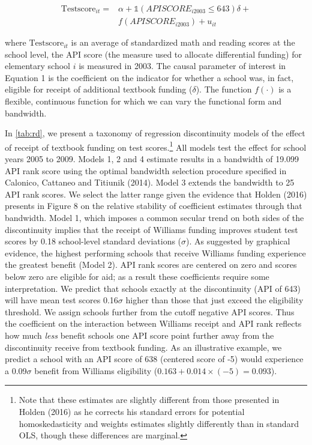 \documentclass[a4paper, 11pt]{article}
\begin{document}
\begin{enumerate}
\begin{equation} 
\begin{aligned}
\text{Testscore}_{it}= & \alpha+ \mathbb{1} \left(APISCORE_{i2003} \leq 643\right)\delta + \\
& f\left(APISCORE_{i2003}\right)+u_{it}
\label{eq:1}
\end{aligned}
\end{equation}

	where $\text{Testscore}_{it}$ is an average of standardized math and reading scores at the school level, the API score (the measure used to allocate differential funding) for elementary school $i$ is measured in 2003. The causal parameter of interest in Equation 1 is the coefficient on the indicator for whether a school was, in fact, eligible for receipt of additional textbook funding ($\delta$). The function $f(\cdot)$ is a flexible, continuous function for which we can vary the functional form and bandwidth.


	In \autoref{tab:rd}, we present a taxonomy of regression discontinuity models of the effect of receipt of textbook funding on test scores.\footnote{Note that these estimates are slightly different from those presented in Holden (2016) as he corrects his standard errors for potential homoskedasticity and weights estimates slightly differently than in standard OLS, though these differences are marginal.}  All models test the effect for school years 2005 to 2009. Models 1, 2 and 4 estimate results in a bandwidth of 19.099 API rank score using the optimal bandwidth selection procedure specified in Calonico, Cattaneo and Titiunik (2014). Model 3 extends the bandwidth to 25 API rank scores. We select the latter range given the evidence that Holden (2016) presents in Figure 8 on the relative stability of coefficient estimates through that bandwidth. Model 1, which imposes a common secular trend on both sides of the discontinuity implies that the receipt of Williams funding improves student test scores by 0.18 school-level standard deviations ($\sigma$). As suggested by graphical evidence, the highest performing schools that receive Williams funding experience the greatest benefit (Model 2). API rank scores are centered on zero and scores below zero are eligible for aid; as a result these coefficients require some interpretation. We predict that schools exactly at the discontinuity (API of 643) will have mean test scores 0.16$\sigma$ higher than those that just exceed the eligibility threshold. We assign schools further from the cutoff negative API scores. Thus the coefficient on the interaction between Williams receipt and API rank reflects how much \textit{less} benefit schools one API score point further away from the discontinuity receive from textbook funding. As an illustrative example, we predict a school with an API score of 638 (centered score of -5) would experience a 0.09$\sigma$ benefit from Williams eligibility ($0.163+0.014 \times (-5)=0.093$).


\end{enumerate}
\end{document}
